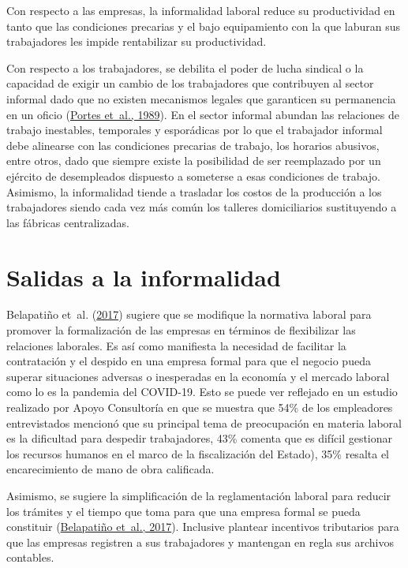 \documentclass[
  letterpaper,
  12pt,
  oneside,
  spanish,
  doublespacing,
  headsepline,
  parskip]{MastersDoctoralThesis}
\begin{document}
Con respecto a las empresas, la informalidad laboral reduce su
productividad en tanto que las condiciones precarias y el bajo
equipamiento con la que laburan sus trabajadores les impide rentabilizar
su productividad.

Con respecto a los trabajadores, se debilita el poder de lucha sindical
o la capacidad de exigir un cambio de los trabajadores que contribuyen
al sector informal dado que no existen mecanismos legales que garanticen
su permanencia en un oficio (\protect\hyperlink{ref-theinfo1989}{Portes
et~al., 1989}). En el sector informal abundan las relaciones de trabajo
inestables, temporales y esporádicas por lo que el trabajador informal
debe alinearse con las condiciones precarias de trabajo, los horarios
abusivos, entre otros, dado que siempre existe la posibilidad de ser
reemplazado por un ejército de desempleados dispuesto a someterse a esas
condiciones de trabajo. Asimismo, la informalidad tiende a trasladar los
costos de la producción a los trabajadores siendo cada vez más común los
talleres domiciliarios sustituyendo a las fábricas centralizadas.

\hypertarget{salidas-a-la-informalidad}{%
\section{Salidas a la informalidad}\label{salidas-a-la-informalidad}}

Belapatiño et~al. (\protect\hyperlink{ref-belapatiuxf1o2017}{2017})
sugiere que se modifique la normativa laboral para promover la
formalización de las empresas en términos de flexibilizar las relaciones
laborales. Es así como manifiesta la necesidad de facilitar la
contratación y el despido en una empresa formal para que el negocio
pueda superar situaciones adversas o inesperadas en la economía y el
mercado laboral como lo es la pandemia del COVID-19. Esto se puede ver
reflejado en un estudio realizado por Apoyo Consultoría en que se
muestra que 54\% de los empleadores entrevistados mencionó que su
principal tema de preocupación en materia laboral es la dificultad para
despedir trabajadores, 43\% comenta que es difícil gestionar los
recursos humanos en el marco de la fiscalización del Estado), 35\%
resalta el encarecimiento de mano de obra calificada.

Asimismo, se sugiere la simplificación de la reglamentación laboral para
reducir los trámites y el tiempo que toma para que una empresa formal se
pueda constituir (\protect\hyperlink{ref-belapatiuxf1o2017}{Belapatiño
et~al., 2017}). Inclusive plantear incentivos tributarios para que las
empresas registren a sus trabajadores y mantengan en regla sus archivos
contables.
\end{document}

